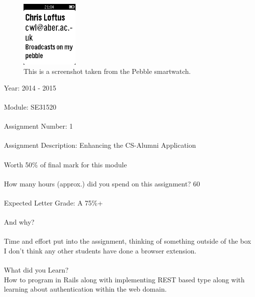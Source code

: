 \documentclass{article}
\begin{document}
\begin{figure}[H]
\centering
\includegraphics[width=0.25\textwidth]{pebblesh}
\caption{This is a screenshot taken from the Pebble smartwatch.}
\end{figure}

\newpage

\nocite{bs:2014:online}
\nocite{bw:2014:online}
\nocite{jq:2014:online}
\nocite{qu:2014:online}
\nocite{mo:2014:online}
\nocite{af:2014:online}
\nocite{bi:2014:online}

\newpage
\printbibheading
\printbibliography[keyword=web,title={Web}]
\printbibliography[keyword=libs,title={Attributions}]

\newpage

Year: 2014 - 2015\\
\\
Module: SE31520\\
\\
Assignment Number: 1\\
\\
Assignment Description: Enhancing the CS-Alumni Application\\
\\
Worth 50\% of final mark for this module\\
\\
How many hours (approx.) did you spend on this assignment? 60\\
\\
Expected Letter Grade: A 75\%+\\
\\
And why?\\
\\
Time and effort put into the assignment, thinking of something outside of the box I don't think any other students have done a browser extension.\\
\\
What did you Learn? 
\\
How to program in Rails along with implementing REST based type along with learning about authentication within the web domain.\\
\end{document}
